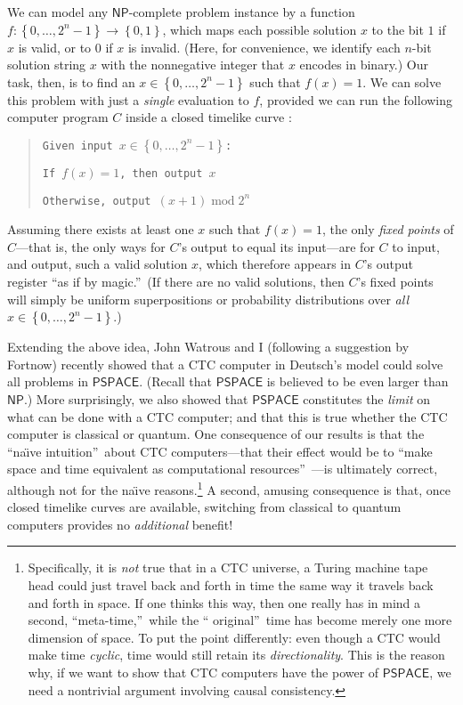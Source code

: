 \documentclass[12pt,onecolumn]{article}%
\begin{document}
We can model any $\mathsf{NP}$-complete problem instance by a function
$f:\left\{  0,\ldots,2^{n}-1\right\}  \rightarrow\left\{  0,1\right\}  $,
which maps each possible solution $x$ to the bit $1$ if $x$ is valid, or to
$0$ if $x$ is invalid. (Here, for convenience, we identify each $n$-bit
solution string $x$ with the nonnegative integer that $x$ encodes in
binary.) Our task, then, is to find an $x\in\left\{  0,\ldots,2^{n}%
-1\right\}  $ such that $f(x)  =1$. We can solve this problem
with just a \textit{single} evaluation to $f$, provided we can run the
following computer program $C$ inside a closed timelike curve
\cite{brun,aar:np,awat}:

\begin{quotation}
\texttt{Given input }$x\in\left\{  0,\ldots,2^{n}-1\right\}  $\texttt{:}

\texttt{If }$f(x)  =1$\texttt{, then output }$x$

\texttt{Otherwise, output }$\left(  x+1\right)  \operatorname{mod}2^{n}$
\end{quotation}

Assuming there exists at least one $x$ such that $f(x)  =1$, the
only \textit{fixed points} of $C$---that is, the only ways for $C$'s output to
equal its input---are for $C$ to input, and output, such a valid solution $x$,
which therefore appears in $C$'s output register \textquotedblleft as if by
magic.\textquotedblright\  (If there are no valid solutions, then $C$'s
fixed points will simply be uniform superpositions or probability
distributions over \textit{all} $x\in\left\{  0,\ldots,2^{n}-1\right\}  $.)

Extending the above idea, John Watrous and I \cite{awat} (following a
suggestion by Fortnow) recently showed that a CTC computer in Deutsch's model
could solve all problems in $\mathsf{PSPACE}$. (Recall that $\mathsf{PSPACE}%
$ is believed to be even larger than $\mathsf{NP}$.) More surprisingly, we
also showed that $\mathsf{PSPACE}$ constitutes the \textit{limit} on what can
be done with a CTC computer; and that this is true whether the CTC computer is
classical or quantum. One consequence of our results is that the
\textquotedblleft na\"{\i}ve intuition\textquotedblright\  about CTC
computers---that their effect would be to \textquotedblleft make space and
time equivalent as computational resources\textquotedblright\ ---is ultimately
correct, although not for the na\"{\i}ve reasons.\footnote{Specifically, it
is \textit{not} true that in a CTC universe, a Turing machine tape head could
just travel back and forth in time the same way it travels back and forth in
space. If one thinks this way, then one really has in mind a second,
\textquotedblleft meta-time,\textquotedblright\  while the \textquotedblleft
original\textquotedblright\  time has become merely one more dimension of
space. To put the point differently: even though a CTC would make time
\textit{cyclic}, time would still retain its \textit{directionality}. This
is the reason why, if we want to show that CTC computers have the power of
$\mathsf{PSPACE}$, we need a nontrivial argument involving causal
consistency.} A second, amusing consequence is that, once closed timelike
curves are available, switching from classical to quantum computers provides
no \textit{additional} benefit!
\end{document}
